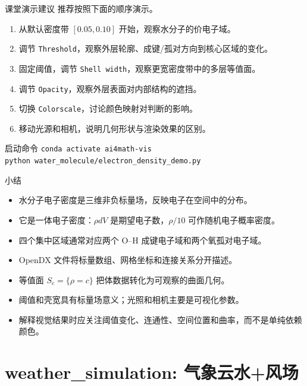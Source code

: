\documentclass[aspectratio=169,11pt]{ctexbeamer}
\begin{document}
\begin{frame}{课堂演示建议}
  推荐按照下面的顺序演示。

  \begin{enumerate}
    \item 从默认密度带 $[0.05,0.10]$ 开始，观察水分子的价电子域。
    \item 调节 \texttt{Threshold}，观察外层轮廓、成键/孤对方向到核心区域的变化。
    \item 固定阈值，调节 \texttt{Shell width}，观察更宽密度带中的多层等值面。
    \item 调节 \texttt{Opacity}，观察外层表面对内部结构的遮挡。
    \item 切换 \texttt{Colorscale}，讨论颜色映射对判断的影响。
    \item 移动光源和相机，说明几何形状与渲染效果的区别。
  \end{enumerate}

  \begin{block}{启动命令}
    \texttt{conda activate ai4math-vis}\\
    \texttt{python water\_molecule/electron\_density\_demo.py}
  \end{block}
\end{frame}

\begin{frame}{小结}
  \begin{itemize}
    \item 水分子电子密度是三维非负标量场，反映电子在空间中的分布。
    \item 它是一体电子密度：$\rho dV$ 是期望电子数，$\rho/10$ 可作随机电子概率密度。
    \item 四个集中区域通常对应两个 O--H 成键电子域和两个氧孤对电子域。
    \item OpenDX 文件将标量数组、网格坐标和连接关系分开描述。
    \item 等值面 $S_c=\{\rho=c\}$ 把体数据转化为可观察的曲面几何。
    \item 阈值和壳宽具有标量场意义；光照和相机主要是可视化参数。
    \item 解释视觉结果时应关注阈值变化、连通性、空间位置和曲率，而不是单纯依赖颜色。
  \end{itemize}
\end{frame}

\part{weather\_simulation: 气象云水+风场}
\end{document}
